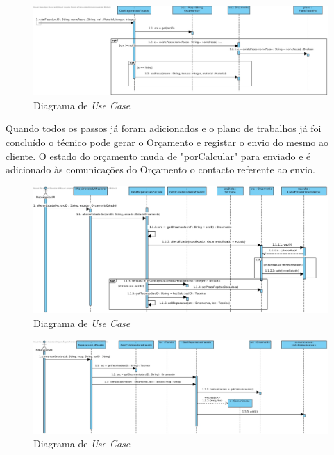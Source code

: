 \documentclass[../relatorio.tex]{subfiles}
\begin{document}
\begin{figure}[!ht]
    \centering
    \includegraphics[scale=0.45]{../assets/diagramas_sequencia/sd-criarPasso2.jpg}
    \caption{Diagrama de \textit{Use Case}}
\end{figure}

Quando todos os passos já foram adicionados e o plano de trabalhos já foi concluído o técnico pode gerar o Orçamento e registar o 
envio do mesmo ao cliente. O estado do orçamento muda de "porCalcular" para enviado e é adicionado às comunicações do Orçamento o 
contacto referente ao envio.

\begin{figure}[!ht]
    \centering
    \includegraphics[scale=0.45]{../assets/diagramas_sequencia/sd-alterarEstadoOrc.jpg}
    \caption{Diagrama de \textit{Use Case}}
\end{figure}

\begin{figure}[!ht]
    \centering
    \includegraphics[scale=0.45]{../assets/diagramas_sequencia/sd-ComunicarErro.jpg}
    \caption{Diagrama de \textit{Use Case}}
\end{figure}
    
\end{document}
